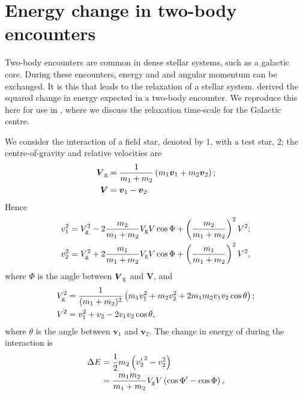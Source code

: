 \chapter{Energy change in two-body encounters}\label{ap:Chandra}

Two-body encounters are common in dense stellar systems, such as a galactic core. During these encounters, energy and and angular momentum can be exchanged. It is this that leads to the relaxation of a stellar system. \citet[chapter 2]{Chandrasekhar1960} derived the squared change in energy expected in a two-body encounter. We reproduce this here for use in , where we discuss the relaxation time-scale for the Galactic centre.

We consider the interaction of a field star, denoted by 1, with a test star, 2; the centre-of-gravity and relative velocities are
\begin{subequations}
\label{eq:Vs}
\begin{align}
\boldsymbol{V}_\mathrm{g} = {} & \dfrac{1}{m_1 + m_2}\left(m_1 \boldsymbol{v}_1 + m_2 \boldsymbol{v}_2\right);\\
\boldsymbol{V} = {} & \boldsymbol{v}_1 - \boldsymbol{v}_2.
\end{align}
\end{subequations}
Hence
\begin{subequations}
\begin{align}
v_1^2 = {} & V_\mathrm{g}^2 - 2\dfrac{m_2}{m_1 + m_2}V_\mathrm{g}V \cos\Phi + \left(\dfrac{m_2}{m_1 + m_2}\right)^2V^2;\\
v_2^2 = {} & V_\mathrm{g}^2 + 2\dfrac{m_1}{m_1 + m_2}V_\mathrm{g}V \cos\Phi + \left(\dfrac{m_1}{m_1 + m_2}\right)^2V^2,
\end{align}
\end{subequations}
where $\Phi$ is the angle between $\boldsymbol{V}_\mathrm{g}$ and $\boldsymbol{V}$, and
\begin{subequations}
\label{eq:V2s}
\begin{align}
V_\mathrm{g}^2 = {} & \dfrac{1}{(m_1 + m_2)^2}\left(m_1v_1^2 + m_2v_2^2 + 2 m_1 m_2 v_1 v_2 \cos\theta\right);\\
V^2 = {} & v_1^2 + v_2 - 2 v_1 v_2 \cos\theta,
\end{align}
\end{subequations}
where $\theta$ is the angle between $\boldsymbol{v}_1$ and $\boldsymbol{v}_2$. The change in energy of during the interaction is
\begin{align}
\Delta E = {} & \dfrac{1}{2} m_2 \left({v'_2}^2 - v_2^2\right)\\
 = {} & \dfrac{m_1 m_2}{m_1 + m_2}V_\mathrm{g}V\left(\cos\Phi' - \cos\Phi\right),
\end{align}

